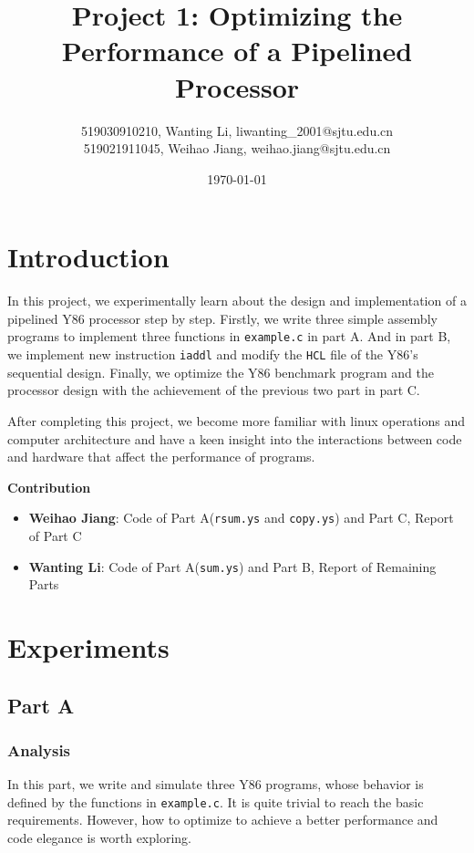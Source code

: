 \documentclass{article}
\title{\textbf{Project 1: Optimizing the Performance of a Pipelined Processor}} %
\author{519030910210, Wanting Li, liwanting\_2001@sjtu.edu.cn\\
		519021911045, Weihao Jiang, weihao.jiang@sjtu.edu.cn}%
\date{\today} %
\begin{document}
\maketitle %

\section{Introduction}

In this project, we experimentally learn about the design and implementation of a pipelined Y86 processor step by step. Firstly, we write three simple assembly programs to implement three functions in \texttt{example.c} in part A. And in part B, we implement new instruction \texttt{iaddl} and modify the \texttt{HCL} file of the Y86's sequential design. Finally, we optimize the Y86 benchmark program and the processor design with the achievement of the previous two part in part C.

After completing this project, we become more familiar with linux operations and computer architecture and have a keen insight into the interactions between code and hardware that affect the performance of programs.

\textbf{Contribution}
	\begin{itemize}
		\item \textbf{Weihao Jiang}: Code of Part A(\texttt{rsum.ys} and \texttt{copy.ys}) and Part C, Report of Part C
		\item \textbf{Wanting Li}: Code of Part A(\texttt{sum.ys}) and Part B, Report of Remaining Parts
	\end{itemize}
\section{Experiments}

\subsection{Part A}

\subsubsection{Analysis}

In this part, we write and simulate three Y86 programs, whose behavior is defined by the functions in \texttt{example.c}. It is quite trivial to reach the basic requirements. However, how to optimize to achieve a  better performance and code elegance is worth exploring.
\end{document}
